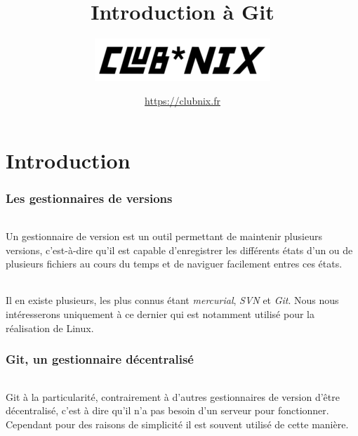 \documentclass[french, a4paper, 12pt, titlepage]{article}
\begin{document}
\title{Introduction à Git}
\author{\includegraphics{clubnix}}
\date{\url{https://clubnix.fr}}

\maketitle

\vfill
\pagebreak

\newpage
\strut\thispagestyle{empty}
\vfill
\pagebreak
\tableofcontents
\strut\thispagestyle{empty}
\newpage
\setcounter{page}{1}

\part{Introduction}

\section{Les gestionnaires de versions}

\paragraph{} Un gestionnaire de version est un outil permettant de maintenir
plusieurs versions, c'est-à-dire qu'il est capable d'enregistrer les différents
états d'un ou de plusieurs fichiers au cours du temps et de naviguer facilement
entres ces états.

\paragraph{} Il en existe plusieurs, les plus connus étant \emph{mercurial},
\emph{SVN} et \emph{Git}.  Nous nous intéresserons uniquement à ce dernier qui
est notamment utilisé pour la réalisation de Linux.

\section{Git, un gestionnaire décentralisé}

\paragraph{} Git à la particularité, contrairement à d'autres gestionnaires de
version d'être décentralisé, c'est à dire qu'il n'a pas besoin d'un serveur
pour fonctionner.  Cependant pour des raisons de simplicité il est souvent
utilisé de cette manière.
\end{document}
